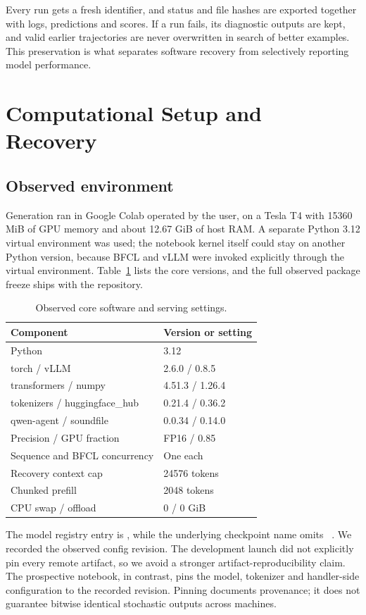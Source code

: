 \documentclass[conference]{IEEEtran}
\newcommand{\code}[1]{\texttt{\detokenize{#1}}}
\begin{document}
Every run gets a fresh identifier, and status and file hashes are exported together with logs, predictions and scores. If a run fails, its diagnostic outputs are kept, and valid earlier trajectories are never overwritten in search of better examples. This preservation is what separates software recovery from selectively reporting model performance.

\section{Computational Setup and Recovery}
\subsection{Observed environment}
Generation ran in Google Colab operated by the user, on a Tesla T4 with 15360 MiB of GPU memory and about 12.67 GiB of host RAM. A separate Python 3.12 virtual environment was used; the notebook kernel itself could stay on another Python version, because BFCL and vLLM were invoked explicitly through the virtual environment. Table~\ref{tab:environment} lists the core versions, and the full observed package freeze ships with the repository.

\begin{table}[t]\caption{Observed core software and serving settings.}\label{tab:environment}\centering\small
\begin{tabular}{ll}\toprule
Component & Version or setting\\\midrule
Python & 3.12\\
torch / vLLM & 2.6.0 / 0.8.5\\
transformers / numpy & 4.51.3 / 1.26.4\\
tokenizers / huggingface\_hub & 0.21.4 / 0.36.2\\
qwen-agent / soundfile & 0.0.34 / 0.14.0\\
Precision / GPU fraction & FP16 / 0.85\\
Sequence and BFCL concurrency & One each\\
Recovery context cap & 24576 tokens\\
Chunked prefill & 2048 tokens\\
CPU swap / offload & 0 / 0 GiB\\\bottomrule
\end{tabular}
\end{table}

The model registry entry is , while the underlying checkpoint name omits \code{-FC}~\cite{qwencheckpoint}. We recorded the observed config revision. The development launch did not explicitly pin every remote artifact, so we avoid a stronger artifact-reproducibility claim. The prospective notebook, in contrast, pins the model, tokenizer and handler-side configuration to the recorded revision. Pinning documents provenance; it does not guarantee bitwise identical stochastic outputs across machines.
\end{document}
